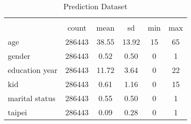 \begin{table}[htbp]\centering
\def\sym#1{\ifmmode^{#1}\else\(^{#1}\)\fi}
\caption{Prediction Dataset\label{tab:prediction}}
\begin{tabular}{l*{1}{ccccc}}
\hline\hline
            &\multicolumn{5}{c}{}                                            \\
            &       count&        mean&          sd&         min&         max\\
\hline
age         &      286443&       38.55&       13.92&          15&          65\\
gender      &      286443&        0.52&        0.50&           0&           1\\
education year&      286443&       11.72&        3.64&           0&          22\\
kid         &      286443&        0.61&        1.16&           0&          15\\
marital status&      286443&        0.55&        0.50&           0&           1\\
taipei      &      286443&        0.09&        0.28&           0&           1\\
\hline\hline
\end{tabular}
\end{table}
